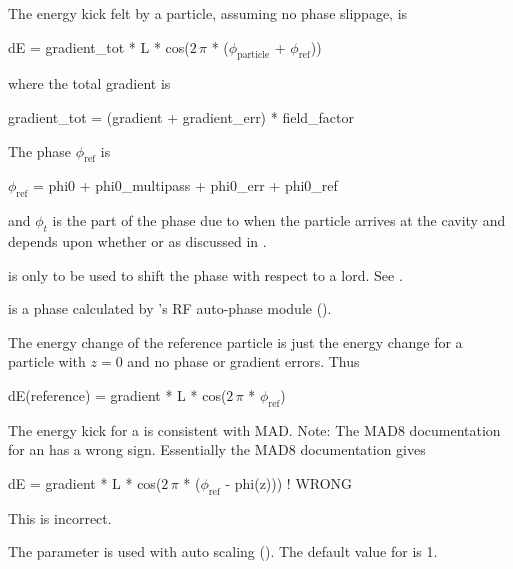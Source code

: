 The energy kick felt by a particle, assuming no phase slippage, is 
\begin{example}
  dE = gradient_tot * L * cos(\(2\,\pi\) * (\(\phi_\text{particle}\) + \(\phi_\text{ref}\)))
\end{example}
where the total gradient is
\begin{example}
  gradient_tot = (gradient + gradient_err) * field_factor
\end{example}
The phase $\phi_{\text{ref}}$ is
\begin{example}
  \(\phi_{\text{ref}}\) = phi0 + phi0_multipass + phi0_err + phi0_ref
\end{example}
and $\phi_t$ is the part of the phase due to when the particle arrives
at the cavity and depends upon whether  or 
 as discussed in .

 is only to be used to shift the phase with respect to a
 lord. See .

 is a phase calculated by \bmad's RF auto-phase module
().

The energy change of the reference particle is just the energy change for a 
particle with $z = 0$ and no phase or gradient errors. Thus
\begin{example}
  dE(reference) = gradient * L * cos(\(2\,\pi\) * \(\phi_{\text{ref}}\))
\end{example}

The energy kick for a \bmad {} is consistent with MAD. 
Note: The MAD8 documentation for an  has a wrong
sign. Essentially the MAD8 documentation gives
\begin{example}
  dE = gradient * L * cos(\(2\,\pi\) * (\(\phi_{\text{ref}}\) - phi(z))) ! WRONG
\end{example}
This is incorrect. 

The  parameter is used with auto scaling
(). The default value for  is 1.

